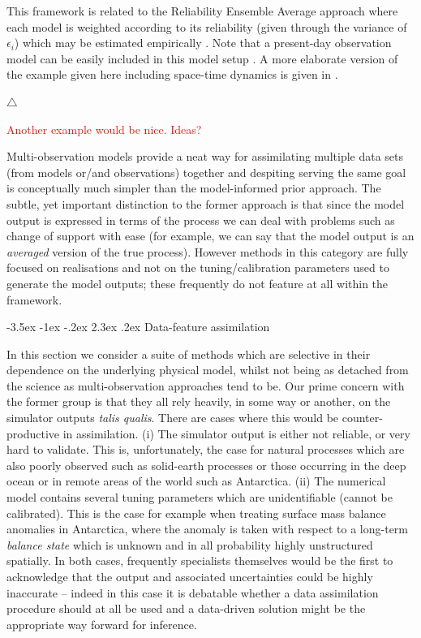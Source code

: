 \documentclass[10pt,a4paper]{article}
\makeatletter
\newcommand\xqed[1]{%
  \leavevmode\unskip\penalty9999 \hbox{}\nobreak\hfill
  \quad\hbox{#1}}
\newcommand\demo{\xqed{$\triangle$}}
\newcommand{\red}{\textcolor{red}}
\renewcommand\section{\@startsection{section}{1}{\z@}%
                                  {-3.5ex \@plus -1ex \@minus -.2ex}%
                                  {2.3ex \@plus.2ex}%
                                  {\normalfont\large\bfseries}}
\makeatother
\begin{document}
\noindent This framework is related to the Reliability Ensemble Average approach where each model is weighted according to its reliability (given through the variance of $\epsilon_i$) which may be estimated empirically \citep{Giorgi_2002}. Note that a present-day observation model can be easily included in this model setup \citep[see also][]{Smith_2009,Tebaldi_2007}. A more elaborate version of the example given here including space-time dynamics is given in \cite{Berliner_2008}.

\demo


\red{Another example would be nice. Ideas?}

Multi-observation models provide a neat way for assimilating multiple data sets (from models or/and observations) together and despiting serving the same goal is conceptually much simpler than the model-informed prior approach. The subtle, yet important distinction to the former approach is that since the model output is expressed in terms of the process we can deal with problems such as change of support with ease (for example, we can say that the model output is an \emph{averaged} version of the true process). However methods in this category are fully focused on realisations and not on the tuning/calibration parameters used to generate the model outputs; these frequently do not feature at all within the framework.  



\section{Data-feature assimilation}

In this section we consider a suite of methods which are selective in their dependence on the underlying physical model, whilst not being as detached from the science as multi-observation approaches tend to be. Our prime concern with the former group is that they all rely heavily, in some way or another, on the simulator outputs \emph{talis qualis}. There are cases where this would be counter-productive in assimilation. (i) The simulator output is either not reliable, or very hard to validate. This is, unfortunately, the case for natural processes which are also poorly observed such as solid-earth processes or those occurring in the deep ocean or in remote areas of the world such as Antarctica. (ii) The numerical model contains several tuning parameters which are unidentifiable (cannot be calibrated). This is the case for example when treating surface mass balance anomalies in Antarctica, where the anomaly is taken with respect to a long-term \emph{balance state} which is unknown and in all probability highly unstructured spatially. In both cases, frequently specialists themselves would be the first to acknowledge that the output and associated uncertainties could be highly inaccurate -- indeed in this case it is debatable whether a data assimilation procedure should at all be used and a data-driven solution might be the appropriate way forward for inference. 
\end{document}
